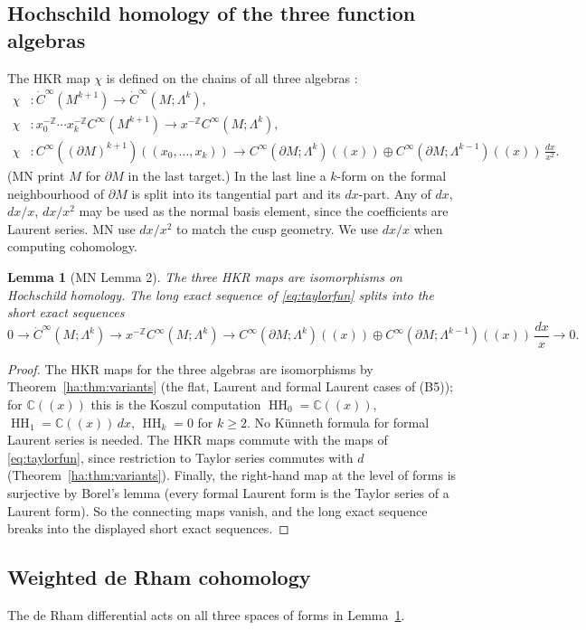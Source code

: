 \documentclass[11pt,oneside,reqno]{article}
\DeclareMathOperator{\HH}{HH}
\newcommand{\C}{\mathbb C}
\newcommand{\Z}{\mathbb Z}
\newcommand{\CI}{C^\infty}
\newcommand{\dCI}{\dot C^\infty}
\theoremstyle{plain}
\newtheorem{lemma}[theorem]{Lemma}
\theoremstyle{definition}
\theoremstyle{remark}
\newcommand{\Lser}[1]{(\!(#1)\!)}
\begin{document}
\subsection{Hochschild homology of the three function algebras}
The HKR map \(\chi\) is defined on the chains of all three algebras
\cite[(27)]{MN}:
\begin{align*}
 \chi&:\dCI(M^{k+1})\to\dCI(M;\Lambda^k),\\
 \chi&:x_0^{-\Z}\cdots x_k^{-\Z}\CI(M^{k+1})\to x^{-\Z}\CI(M;\Lambda^k),\\
 \chi&:\CI((\partial M)^{k+1})\Lser{x_0,\dots,x_k}\to
 \CI(\partial M;\Lambda^k)\Lser{x}\oplus\CI(\partial M;\Lambda^{k-1})\Lser{x}
 \,\frac{dx}{x^2} .
\end{align*}
(MN print \(M\) for \(\partial M\) in the last target.) In the last line a
\(k\)-form on the formal neighbourhood of \(\partial M\) is split into its
tangential part and its \(dx\)-part. Any of \(dx\), \(dx/x\), \(dx/x^2\)
may be used as the normal basis element, since the coefficients are Laurent
series. MN use \(dx/x^2\) to match the cusp geometry. We use \(dx/x\) when
computing cohomology.

\begin{lemma}[MN Lemma 2]\label{lem:fun}
The three HKR maps are isomorphisms on Hochschild homology. The long exact
sequence of \eqref{eq:taylorfun} splits into the short exact sequences
\cite[(28)]{MN}
\[
 0\to\dCI(M;\Lambda^k)\to x^{-\Z}\CI(M;\Lambda^k)\to
 \CI(\partial M;\Lambda^k)\Lser{x}\oplus\CI(\partial M;\Lambda^{k-1})\Lser{x}\,
 \frac{dx}{x}\to0 .
\]
\end{lemma}

\begin{proof}
The HKR maps for the three algebras are isomorphisms by
Theorem~\ref{ha:thm:variants} (the flat, Laurent and formal Laurent cases
of (B5)); for \(\C\Lser{x}\) this is the Koszul computation \(\HH_0=
\C\Lser{x}\), \(\HH_1=\C\Lser{x}\,dx\), \(\HH_k=0\) for \(k\ge2\). No
K\"unneth formula for formal Laurent series is needed. The HKR maps
commute with the maps of \eqref{eq:taylorfun}, since restriction to Taylor
series commutes with \(d\) (Theorem~\ref{ha:thm:variants}). Finally, the
right-hand map at the level of forms is surjective by Borel's lemma (every
formal Laurent form is the Taylor series of a Laurent form). So the
connecting maps vanish, and the long exact sequence breaks into the
displayed short exact sequences.
\end{proof}

\subsection{Weighted de Rham cohomology}
The de Rham differential acts on all three spaces of forms in
Lemma~\ref{lem:fun}.
\end{document}
